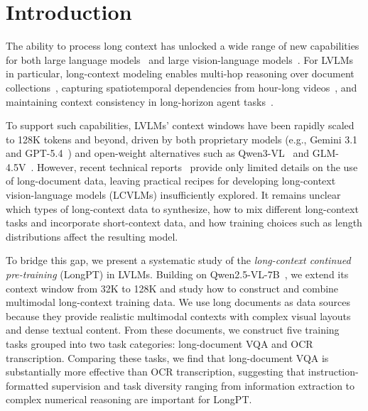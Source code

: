 
\section{Introduction}
\label{sec:introduction} 
The ability to process long context has unlocked a wide range of new capabilities for both large language models~\citep[LLMs;][]{yang2025qwen3,llama4} and large vision-language models~\citep[LVLMs;][]{bai2025qwen3,seed2_0}. 
For LVLMs in particular, long-context modeling enables multi-hop reasoning over document collections~\citep{wang2025mmlongbench,wang2024multimodal}, capturing spatiotemporal dependencies from hour-long videos~\citep{wu2024longvideobench,fu2025video}, and maintaining context consistency in long-horizon agent tasks~\citep{geng2025webwatcher,zhang2026browsecomp,zhang2026clawbench}.

To support such capabilities, LVLMs' context windows have been rapidly scaled to 128K tokens and beyond, driven by both proprietary models (e.g., Gemini 3.1~\citep{gemini_3_1_pro_2026} and GPT-5.4~\citep{openai2026introducing_gpt5_4}) and open-weight alternatives such as Qwen3-VL~\citep{bai2025qwen3} and GLM-4.5V~\citep{hong2025glm}. 
However, recent technical reports~\citep{bai2025qwen3,hong2025glm} provide only limited details on the use of long-document data, leaving practical recipes for developing long-context vision-language models (LCVLMs) insufficiently explored. 
It remains unclear which types of long-context data to synthesize, how to mix different long-context tasks and incorporate short-context data, and how training choices such as length distributions affect the resulting model.

To bridge this gap, we present a systematic study of the \emph{long-context continued pre-training} (LongPT) in LVLMs. 
Building on Qwen2.5-VL-7B~\citep{bai2025qwen2}, we extend its context window from 32K to 128K and study how to construct and combine multimodal long-context training data.
We use long documents as data sources because they provide realistic multimodal contexts with complex visual layouts and dense textual content.
From these documents, we construct five training tasks grouped into two task categories: long-document VQA and OCR transcription.
Comparing these tasks, we find that long-document VQA is substantially more effective than OCR transcription, suggesting that instruction-formatted supervision and task diversity ranging from information extraction to complex numerical reasoning are important for LongPT.

